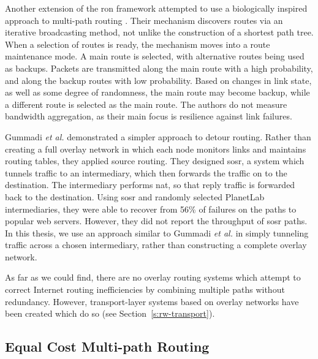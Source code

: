 \documentclass{cwru}
\begin{document}
Another extension of the \ac{ron} framework attempted to use a biologically
inspired approach to multi-path routing \cite{leibnitz2006biologically}. Their
mechanism discovers routes via an iterative broadcasting method, not unlike the
construction of a shortest path tree. When a selection of routes is ready, the
mechanism moves into a route maintenance mode. A main route is selected, with
alternative routes being used as backups. Packets are transmitted along the main
route with a high probability, and along the backup routes with low probability.
Based on changes in link state, as well as some degree of randomness, the main
route may become backup, while a different route is selected as the main route.
The authors do not measure bandwidth aggregation, as their main focus is
resilience against link failures.

Gummadi \textit{et al.} \cite{gummadi2004improving} demonstrated a simpler
approach to detour routing. Rather than creating a full overlay network in which
each node monitors links and maintains routing tables, they applied source
routing. They designed \ac{sosr}, a system which tunnels traffic to an
intermediary, which then forwards the traffic on to the destination. The
intermediary performs \ac{nat}, so that reply traffic is forwarded back to the
destination. Using \ac{sosr} and randomly selected PlanetLab intermediaries,
they were able to recover from 56\% of failures on the paths to popular web
servers. However, they did not report the throughput of \ac{sosr} paths. In this
thesis, we use an approach similar to Gummadi \textit{et al.} in simply
tunneling traffic across a chosen intermediary, rather than constructing a
complete overlay network.

As far as we could find, there are no overlay routing systems which attempt to
correct Internet routing inefficiencies by combining multiple paths without
redundancy. However, transport-layer systems based on overlay networks have been
created which do so (see Section~\ref{s:rw-transport}).

\subsection{Equal Cost Multi-path Routing}
\end{document}

